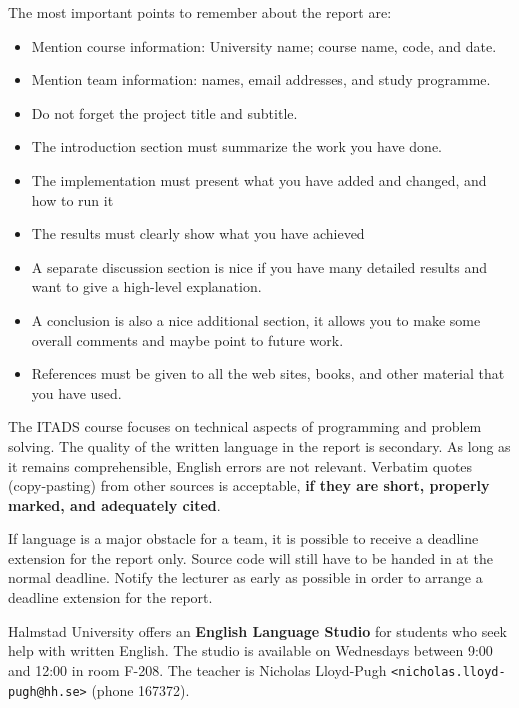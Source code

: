 \documentclass[a4paper,10pt]{article}
\begin{document}
The most important points to remember about the report are:

\begin{itemize}
\item
  Mention course information: University name; course name, code, and date.
\item
  Mention team information: names, email addresses, and study programme.
\item
  Do not forget the project title and subtitle.
\item
  The introduction section must summarize the work you have done.
\item
  The implementation must present what you have added and changed, and how to run it
\item
  The results must clearly show what you have achieved
\item
  A separate discussion section is nice if you have many detailed results and want to give a high-level explanation.
\item
  A conclusion is also a nice additional section, it allows you to make some overall comments and maybe point to future work.
\item
  References must be given to all the web sites, books, and other material that you have used.
\end{itemize}

The ITADS course focuses on technical aspects of programming and problem solving.
The quality of the written language in the report is secondary.
As long as it remains comprehensible, English errors are not relevant.
Verbatim quotes (copy-pasting) from other sources is acceptable, \textbf{if they are short, properly marked, and adequately cited}.

If language is a major obstacle for a team, it is possible to receive a deadline extension for the report only.
Source code will still have to be handed in at the normal deadline.
Notify the lecturer as early as possible in order to arrange a deadline extension for the report.

Halmstad University offers an \textbf{English Language Studio} for students who seek help with written English.
The studio is available on Wednesdays between 9:00 and 12:00 in room F-208.
The teacher is Nicholas Lloyd-Pugh \texttt{<nicholas.lloyd-pugh@hh.se>} (phone 167372).





\end{document}

